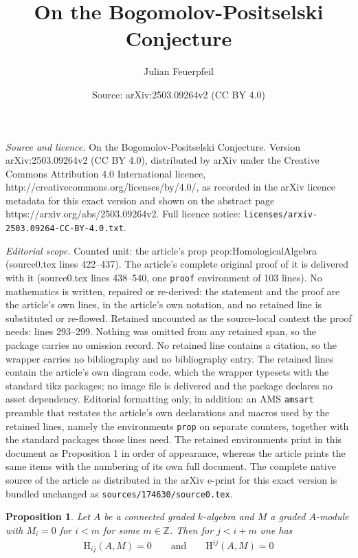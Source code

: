 \documentclass[10pt,a4paper]{amsart}
\title{On the Bogomolov-Positselski Conjecture}
\author{Julian Feuerpfeil}
\date{Source: arXiv:2503.09264v2 (CC BY 4.0)}
\newtheorem{prop}{Proposition}
\newcommand{\ZZ}{\mathbb{Z}}
\newcommand{\rmH}{\mathrm{H}}
\begin{document}
\maketitle

\noindent\emph{Source and licence.} On the Bogomolov-Positselski Conjecture. Version arXiv:2503.09264v2 (CC BY 4.0), distributed by arXiv under the Creative Commons Attribution 4.0 International licence, http://creativecommons.org/licenses/by/4.0/, as recorded in the arXiv licence metadata for this exact version and shown on the abstract page https://arxiv.org/abs/2503.09264v2. Full licence notice: \texttt{licenses/arxiv-2503.09264-CC-BY-4.0.txt}.\par\smallskip

\noindent\textit{Editorial scope.} Counted unit: the article's prop prop:HomologicalAlgebra (source0.tex lines 422--437). The article's complete original proof of it is delivered with it (source0.tex lines 438--540, one \texttt{proof} environment of 103 lines). No mathematics is written, repaired or re-derived: the statement and the proof are the article's own lines, in the article's own notation, and no retained line is substituted or re-flowed.  Retained uncounted as the source-local context the proof needs: lines 293--299.  Nothing was omitted from any retained span, so the package carries no omission record.  No retained line contains a citation, so the wrapper carries no bibliography and no bibliography entry.  The retained lines contain the article's own diagram code, which the wrapper typesets with the standard tikz packages; no image file is delivered and the package declares no asset dependency.  Editorial formatting only, in addition: an AMS \texttt{amsart} preamble that restates the article's own declarations and macros used by the retained lines, namely the environments \texttt{prop} on separate counters, together with the standard packages those lines need.  The retained environments print in this document as Proposition 1 in order of appearance, whereas the article prints the same items with the numbering of its own full document.  The complete native source of the article as distributed in the arXiv e-print for this exact version is bundled unchanged as \texttt{sources/174630/source0.tex}.
\begin{prop}
\label{prop:CohomologyConcentrated}
    Let $A$ be a connected graded $k$-algebra and $M$ a graded $A$-module with $M_i=0$ for $i<m$ for some $m\in \ZZ$. Then for $j<i+m$ one has
    \begin{align*}
        \rmH_{ij}(A,M)=0\qquad\text{and}\qquad \rmH^{ij}(A,M)=0
    \end{align*}
\end{prop}
\end{document}
